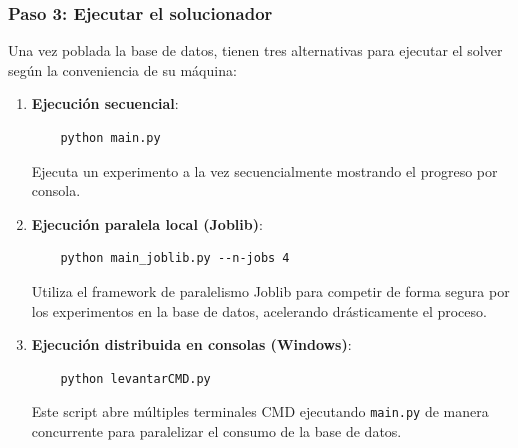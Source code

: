 \subsubsection{Paso 3: Ejecutar el solucionador}

Una vez poblada la base de datos, tienen tres alternativas para ejecutar el solver según la conveniencia de su máquina:

\begin{enumerate}
    \item \textbf{Ejecución secuencial}:
    \begin{verbatim}
    python main.py
    \end{verbatim}
    Ejecuta un experimento a la vez secuencialmente mostrando el progreso por consola.
    
    \item \textbf{Ejecución paralela local (Joblib)}:
    \begin{verbatim}
    python main_joblib.py --n-jobs 4
    \end{verbatim}
    Utiliza el framework de paralelismo Joblib para competir de forma segura por los experimentos en la base de datos, acelerando drásticamente el proceso.
    
    \item \textbf{Ejecución distribuida en consolas (Windows)}:
    \begin{verbatim}
    python levantarCMD.py
    \end{verbatim}
    Este script abre múltiples terminales CMD ejecutando \texttt{main.py} de manera concurrente para paralelizar el consumo de la base de datos.
\end{enumerate}

